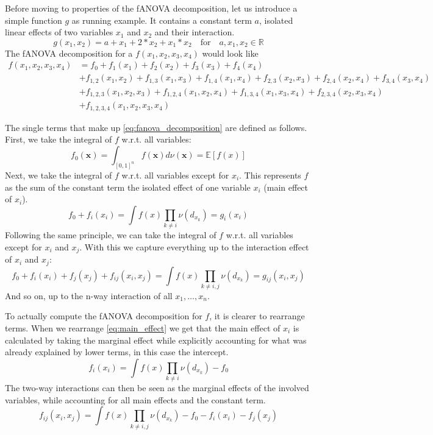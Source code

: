 Before moving to properties of the fANOVA decomposition, let us introduce a simple function $g$ as running example. It contains a constant term $a$, isolated linear effects of two variables $x_1$ and $x_2$ and their interaction.
\[
g(x_1, x_2) = a + x_1 + 2*x_2 + x_1 * x_2 \quad \text{for} \quad a, x_1, x_2 \in \mathbb{R}
\]
The fANOVA decomposition for a \( f(x_1, x_2, x_3, x_4) \) would look like
\begin{align*}
    f(x_1, x_2, x_3, x_4) &= f_0 + f_1(x_1) + f_2(x_2) + f_3(x_3) + f_4(x_4) \\
    &+ f_{1,2}(x_1, x_2) + f_{1,3}(x_1, x_3) + f_{1,4}(x_1, x_4) + f_{2,3}(x_2, x_3) + f_{2,4}(x_2, x_4) + f_{3,4}(x_3, x_4) \\
    &+ f_{1,2,3}(x_1, x_2, x_3) + f_{1,2,4}(x_1, x_2, x_4) + f_{1,3,4}(x_1, x_3, x_4) + f_{2,3,4}(x_2, x_3, x_4) \\
    &+ f_{1,2,3,4}(x_1, x_2, x_3, x_4)
\end{align*}

    
The single terms that make up \autoref{eq:fanova_decomposition} are defined as follows.
First, we take the integral of $f$ w.r.t. all variables:
\begin{equation}
    f_{0}(\mathbf{x}) = \int_{[0, 1]^n} f(\mathbf{x}) d\nu(\mathbf{x}) = \mathbb{E}[f(x)]
    \label{eq:intercapt}
\end{equation}
Next, we take the integral of $f$ w.r.t. all variables except for $x_i$. This represents $f$ as the sum of the constant term the isolated effect of one variable $x_i$ (main effect of $x_i$).
\begin{equation}
    f_0 + f_i(x_i) = \int f(x) \prod_{k \neq i} \nu (d_{x_{k}}) = g_i(x_i)
    \label{eq:main_effect}
\end{equation}
Following the same principle, we can take the integral of $f$ w.r.t. all variables except for $x_i$ and $x_j$. With this we capture everything up to the interaction effect of $x_i$ and $x_j$:
\begin{equation}
    f_0 + f_i(x_i) + f_j(x_j) + f_{ij}(x_i,x_j) = \int f(x) \prod_{k \neq i,j} \nu(d_{x_{k}}) = g_{ij}(x_i, x_j)
    \label{eq:interaction_effects}
\end{equation}
And so on, up to the n-way interaction of all $x_1, \dots, x_n$.\par

To actually compute the fANOVA decomposition for $f$, it is clearer to rearrange terms. When we rearrange \autoref{eq:main_effect} we get that the main effect of $x_i$ is calculated by taking the marginal effect while explicitly accounting for what was already explained by lower terms, in this case the intercept. 
\begin{equation}
    f_i(x_i) = \int f(x) \prod_{k \neq i} \nu(d_{x_{k}}) - f_0
    \label{eq:main_effect_rearranged}
\end{equation}
The two-way interactions can then be seen as the marginal effects of the involved variables, while accounting for all main effects and the constant term. 
\begin{equation}
    f_{ij}(x_i,x_j) = \int f(x) \prod_{k \neq i,j} \nu(d_{x_{k}}) - f_0 - f_i(x_i) - f_j(x_j) 
    \label{eq:interaction_effects}
\end{equation}

